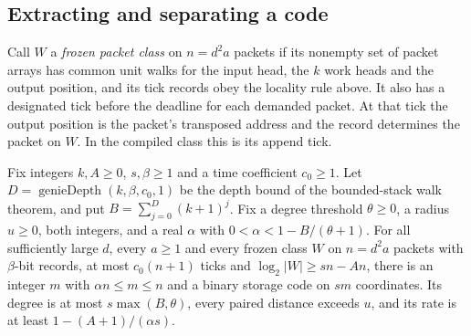 \subsection{Extracting and separating a code}

Call $W$ a \emph{frozen packet class} on $n=d^2a$ packets if its nonempty
set of packet arrays has common unit walks for the input head, the $k$
work heads and the output position, and its tick records obey the
locality rule above. It also has a designated tick before the deadline
for each demanded packet. At that tick the output position is the
packet's transposed address and the record determines the packet on
$W$. In the compiled class this is its append tick.

\begin{proposition}\label{prop:packet-retention}
Fix integers $k,A\ge0$, $s,\beta\ge1$ and a time coefficient $c_0\ge1$.
Let $D=\operatorname{genieDepth}(k,\beta,c_0,1)$ be the depth bound
of the bounded-stack walk theorem, and put
$B=\sum_{j=0}^{D}(k+1)^j$. Fix a degree threshold $\theta\ge0$, a
radius $u\ge0$, both integers, and a real $\alpha$ with
$0<\alpha<1-B/(\theta+1)$.
For all sufficiently large $d$, every $a\ge1$ and every frozen class $W$
on $n=d^2a$ packets with $\beta$-bit records, at most $c_0(n+1)$ ticks
and $\log_2|W|\ge sn-An$, there is an integer $m$ with $\alpha n\le m\le n$ and a binary
storage code on $sm$ coordinates.
Its degree is at most $s\max(B,\theta)$, every paired distance exceeds
$u$, and its rate is at least $1-(A+1)/(\alpha s)$.
\end{proposition}

